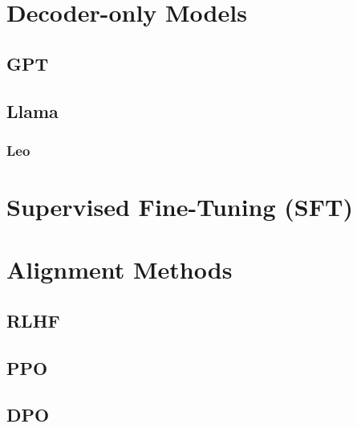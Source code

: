 \section{Decoder-only Models}\label{sec:decoder}

\subsection{GPT}\label{subsec:gpt}

\subsection{Llama}\label{subsec:llama}

\subsubsection{Leo}

\section{Supervised Fine-Tuning (SFT)}\label{sec:supervised-fine-tuning}

\section{Alignment Methods}\label{sec:alignment-methods}

\subsection{RLHF}\label{subsec:rlhf}
\subsection{PPO}\label{subsec:ppo}
\subsection{DPO}\label{subsec:dpo}
